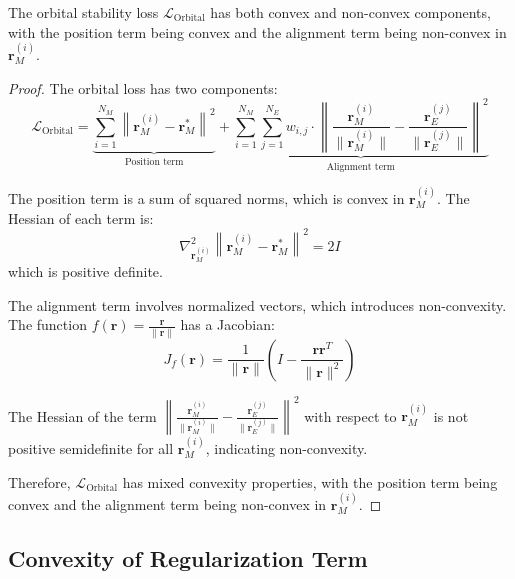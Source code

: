 \begin{theorem}
The orbital stability loss $\mathcal{L}_{\text{Orbital}}$ has both convex and non-convex components, with the position term being convex and the alignment term being non-convex in $\mathbf{r}_M^{(i)}$.
\end{theorem}

\begin{proof}
The orbital loss has two components:
\begin{equation}
\mathcal{L}_{\text{Orbital}} = \underbrace{\sum_{i=1}^{N_M} \left\|\mathbf{r}_M^{(i)} - \mathbf{r}_M^{*}\right\|^2}_{\text{Position term}} + \underbrace{\sum_{i=1}^{N_M} \sum_{j=1}^{N_E} w_{i,j} \cdot \left\|\frac{\mathbf{r}_M^{(i)}}{\|\mathbf{r}_M^{(i)}\|} - \frac{\mathbf{r}_E^{(j)}}{\|\mathbf{r}_E^{(j)}\|}\right\|^2}_{\text{Alignment term}}
\end{equation}

The position term is a sum of squared norms, which is convex in $\mathbf{r}_M^{(i)}$. The Hessian of each term is:
\begin{equation}
\nabla^2_{\mathbf{r}_M^{(i)}} \left\|\mathbf{r}_M^{(i)} - \mathbf{r}_M^{*}\right\|^2 = 2I
\end{equation}
which is positive definite.

The alignment term involves normalized vectors, which introduces non-convexity. The function $f(\mathbf{r}) = \frac{\mathbf{r}}{\|\mathbf{r}\|}$ has a Jacobian:
\begin{equation}
J_f(\mathbf{r}) = \frac{1}{\|\mathbf{r}\|}\left(I - \frac{\mathbf{r}\mathbf{r}^T}{\|\mathbf{r}\|^2}\right)
\end{equation}

The Hessian of the term $\left\|\frac{\mathbf{r}_M^{(i)}}{\|\mathbf{r}_M^{(i)}\|} - \frac{\mathbf{r}_E^{(j)}}{\|\mathbf{r}_E^{(j)}\|}\right\|^2$ with respect to $\mathbf{r}_M^{(i)}$ is not positive semidefinite for all $\mathbf{r}_M^{(i)}$, indicating non-convexity.

Therefore, $\mathcal{L}_{\text{Orbital}}$ has mixed convexity properties, with the position term being convex and the alignment term being non-convex in $\mathbf{r}_M^{(i)}$.
\end{proof}

\subsection{Convexity of Regularization Term}

